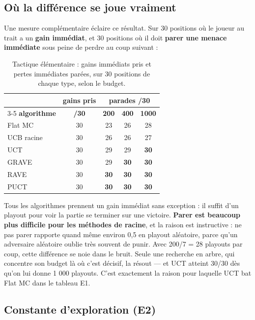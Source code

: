\documentclass[11pt,a4paper]{article}
\begin{document}
\subsection{Où la différence se joue vraiment}\label{ouxf9-la-diffuxe9rence-se-joue-vraiment}

Une mesure complémentaire éclaire ce résultat. Sur
30 positions où le joueur au trait a un \textbf{gain immédiat}, et 30 positions où il
doit \textbf{parer une menace immédiate} sous peine de perdre au coup suivant :

\begin{table}[htbp]
\centering\small
\caption{Tactique élémentaire : gains immédiats pris et pertes immédiates parées, sur 30 positions de chaque type, selon le budget.}
\label{tab:tactique}
\begin{tabular}{@{}lcccc@{}}
\toprule
& \textbf{gains pris} & \multicolumn{3}{c}{\textbf{parades /30}} \\
\cmidrule(l){3-5}
\textbf{algorithme} & \textbf{/30} & \textbf{200} & \textbf{400} & \textbf{1000} \\
\midrule
Flat MC & 30 & 23 & 26 & 28 \\
UCB racine & 30 & 26 & 26 & 27 \\
UCT & 30 & 29 & 29 & \textbf{30} \\
GRAVE & 30 & 29 & \textbf{30} & \textbf{30} \\
RAVE & 30 & \textbf{30} & \textbf{30} & \textbf{30} \\
PUCT & 30 & \textbf{30} & \textbf{30} & \textbf{30} \\
\bottomrule
\end{tabular}
\end{table}

Tous les algorithmes prennent un gain immédiat sans exception : il suffit d'un
playout pour voir la partie se terminer sur une victoire. \textbf{Parer est beaucoup
plus difficile pour les méthodes de racine}, et la raison est instructive : ne
pas parer rapporte quand même environ 0,5 en playout aléatoire, parce qu'un
adversaire aléatoire oublie très souvent de punir. Avec 200/7 = 28 playouts par
coup, cette différence se noie dans le bruit. Seule une recherche en arbre, qui
concentre son budget là où c'est décisif, la résout --- et UCT atteint 30/30 dès
qu'on lui donne 1 000 playouts. C'est exactement la raison pour laquelle UCT bat
Flat MC dans le tableau E1.

\subsection{Constante d'exploration (E2)}\label{constante-dexploration-e2}
\end{document}
